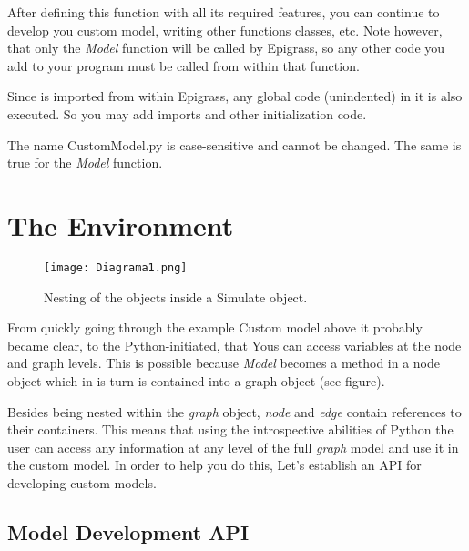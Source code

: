 \documentclass[a4paper,10pt]{manual}
\begin{document}
After defining this function with all its required features, you can continue to develop you custom model, writing other functions classes, etc. Note however, that only the \emph{Model} function will be called by Epigrass, so any other code you add to your program must be called from within that function.

\begin{notice}[note]
Since  is imported from within Epigrass, any global code (unindented) in it is also  executed. So you may add imports and other initialization code.
\end{notice}

\begin{notice}[warning]
The name CustomModel.py is case-sensitive and cannot be changed. The same is true for the \emph{Model} function.
\end{notice}


\section{The Environment}
\begin{figure}[htbp]
\centering

\texttt{[image: Diagrama1.png]}
\caption{Nesting of the objects inside a Simulate object.}\end{figure}

From quickly going through the example Custom model above it probably became clear, to the Python-initiated, that Yous can access variables at the node and graph levels.  This is possible because \emph{Model} becomes a method in a node object which in is turn is contained into a graph object (see figure).

Besides being nested within the \emph{graph} object, \emph{node} and \emph{edge} contain references to their containers. This means that using the introspective abilities of Python the user can access any information at any level of the full \emph{graph} model and use it in the custom model. In order to help you do this, Let's establish an API for developing custom models.


\subsection{Model Development API}
\end{document}
